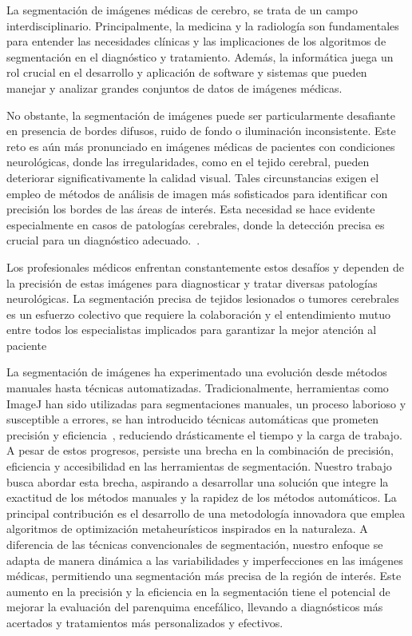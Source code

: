 \documentclass{elsarticle}
\begin{document}
\noindent La segmentación de imágenes médicas de cerebro, se trata de un campo interdisciplinario. Principalmente, la medicina y la radiología son fundamentales para entender las necesidades clínicas y las implicaciones de los algoritmos de segmentación en el diagnóstico y tratamiento. Además, la informática juega un rol crucial en el desarrollo y aplicación de software y sistemas que pueden manejar y analizar grandes conjuntos de datos de imágenes médicas.

\noindent No obstante, la segmentación de imágenes puede ser particularmente desafiante en presencia de bordes difusos, ruido de fondo o iluminación inconsistente. Este reto es aún más pronunciado en imágenes médicas de pacientes con condiciones neurológicas, donde las irregularidades, como en el tejido cerebral, pueden deteriorar significativamente la calidad visual. Tales circunstancias exigen el empleo de métodos de análisis de imagen más sofisticados para identificar con precisión los bordes de las áreas de interés. Esta necesidad se hace evidente especialmente en casos de patologías cerebrales, donde la detección precisa es crucial para un diagnóstico adecuado.~\cite{segmentation_bandyopadhyay_2021,KaushikPancholi2023}.

\noindent Los profesionales médicos enfrentan constantemente estos desafíos y dependen de la precisión de estas imágenes para diagnosticar y tratar diversas patologías neurológicas. La segmentación precisa de tejidos lesionados o tumores cerebrales es un esfuerzo colectivo que requiere la colaboración y el entendimiento mutuo entre todos los especialistas implicados para garantizar la mejor atención al paciente


\noindent La segmentación de imágenes ha experimentado una evolución desde métodos manuales hasta técnicas automatizadas. Tradicionalmente, herramientas como ImageJ han sido utilizadas para segmentaciones manuales, un proceso laborioso y susceptible a errores, se han introducido técnicas automáticas que prometen precisión y eficiencia~\cite{Liu2024,Ilesanmi2024}, reduciendo drásticamente el tiempo y la carga de trabajo. A pesar de estos progresos, persiste una brecha en la combinación de precisión, eficiencia y accesibilidad en las herramientas de segmentación. Nuestro trabajo busca abordar esta brecha, aspirando a desarrollar una solución que integre la exactitud de los métodos manuales y la rapidez de los métodos automáticos.
\noindent La principal contribución es el desarrollo de una metodología innovadora que emplea algoritmos de optimización metaheurísticos inspirados en la naturaleza. A diferencia de las técnicas convencionales de segmentación, nuestro enfoque se adapta de manera dinámica a las variabilidades y imperfecciones en las imágenes médicas, permitiendo una segmentación más precisa de la región de interés. Este aumento en la precisión y la eficiencia en la segmentación tiene el potencial de mejorar la evaluación del parenquima encefálico, llevando a diagnósticos más acertados y tratamientos más personalizados y efectivos. 
\end{document}
